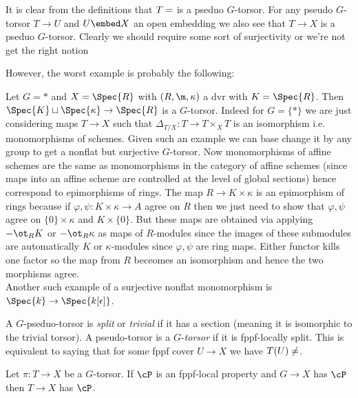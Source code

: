 \documentclass[12pt]{article}
\begin{document}
\begin{example}
It is clear from the definitions that $T = \empty$ is a pseduo $G$-torsor. For any pseudo $G$-torsor $T \to U$ and $U \embed X$ an open embedding we also see that $T \to X$ is a pseduo $G$-torsor. Clearly we should require some sort of surjectivity or we're not get the right notion 
\end{example}

However, the worst example is probably the following:

\begin{example}
Let $G = *$ and $X = \Spec{R}$ with $(R, \m, \kappa)$ a dvr with $K = \Spec{R}$. Then $\Spec{K} \sqcup \Spec{\kappa} \to \Spec{R}$ is a $G$-torsor. Indeed for $G = \{ * \}$ we are just considering maps $T \to X$ such that $\Delta_{T/X} : T \to T \times_X T$ is an isomorphism i.e. monomorphisms of schemes. Given such an example we can base change it by any group to get a nonflat but surjective $G$-torsor. Now monomorphisms of affine schemes are the same as monomorphisms in the category of affine schemes (since maps into an affine scheme are controlled at the level of global sections) hence correspond to epimorphisms of rings. The map $R \to K \times \kappa$ is an epimorphism of rings because if $\varphi, \psi : K \times \kappa \to A$ agree on $R$ then we just need to show that $\varphi, \psi$ agree on $\{ 0 \} \times \kappa$ and $K \times \{ 0 \}$. But these maps are obtained via applying $- \ot_R K$ or $- \ot_R \kappa$ as maps of $R$-modules since the images of these submodules are automatically $K$ or $\kappa$-modules since $\varphi, \psi$ are ring maps. Either functor kills one factor so the map from $R$ beceomes an isomorphism and hence the two morphisms agree. 
\bigskip\\
Another such example of a surjective nonflat monomorphism is $\Spec{k} \to \Spec{k[\epsilon]}$.
\end{example}


\begin{defn}
A $G$-pseduo-torsor is \textit{split} or \textit{trivial} if it has a section (meaning it is isomorphic to the trivial torsor). A pseudo-torsor is a $G$-\textit{torsor} if it is fppf-locally split. This is equivalent to saying that for some fppf cover $U \to X$ we have $T(U) \neq \empty$.
\end{defn}



\begin{prop}
Let $\pi : T \to X$ be a $G$-torsor. If $\cP$ is an fppf-local property and $G \to X$ has $\cP$ then $T \to X$ has $\cP$.
\end{prop}
\end{document}

